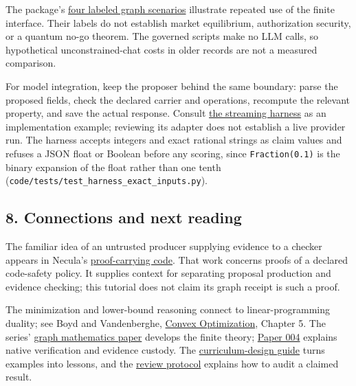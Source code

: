 \documentclass[
  11pt,
]{article}
\begin{document}
The package's \href{code/multi_domain_symbol_game_bouts.py}{four labeled
graph scenarios} illustrate repeated use of the finite interface. Their
labels do not establish market equilibrium, authorization security, or a
quantum no-go theorem. The governed scripts make no LLM calls, so
hypothetical unconstrained-chat costs in older records are not a
measured comparison.

For model integration, keep the proposer behind the same boundary: parse
the proposed fields, check the declared carrier and operations,
recompute the relevant property, and save the actual response. Consult
\href{code/llm_streaming_harness.py}{the streaming harness} as an
implementation example; reviewing its adapter does not establish a live
provider run. The harness accepts integers and exact rational strings as
claim values and refuses a JSON float or Boolean before any scoring,
since \nolinkurl{Fraction(0.1)} is the binary expansion of the float
rather than one tenth
(\nolinkurl{code/tests/test_harness_exact_inputs.py}).

\subsection{8. Connections and next
reading}\label{connections-and-next-reading}

The familiar idea of an untrusted producer supplying evidence to a
checker appears in Necula's
\href{https://doi.org/10.1145/263699.263712}{proof-carrying code}. That
work concerns proofs of a declared code-safety policy. It supplies
context for separating proposal production and evidence checking; this
tutorial does not claim its graph receipt is such a proof.

The minimization and lower-bound reasoning connect to linear-programming
duality; see Boyd and Vandenberghe,
\href{https://doi.org/10.1017/CBO9780511804441}{Convex Optimization},
Chapter 5. The series'
\href{https://github.com/dbccpage/the_symbol_game/blob/59dde95a7860063c25d75db37f40af556e9f28ee/omega_engine_atlas/coda_atlas/F004_papers/015_pfp/001_pfp_discrete_cochain_retraction_and_toy_involutions/paper.md}{graph
mathematics paper} develops the finite theory;
\href{../004/paper.pdf}{Paper 004} explains native verification and
evidence custody. The
\href{https://github.com/dbccpage/the_symbol_game/blob/59dde95a7860063c25d75db37f40af556e9f28ee/omega_engine_atlas/coda_atlas/F004_papers/015_pfp/007_pfp_executable_lessons_and_evidence_boundaries/paper.md}{curriculum-design
guide} turns examples into lessons, and the
\href{../009/paper.pdf}{review protocol} explains how to audit a claimed
result.
\end{document}

